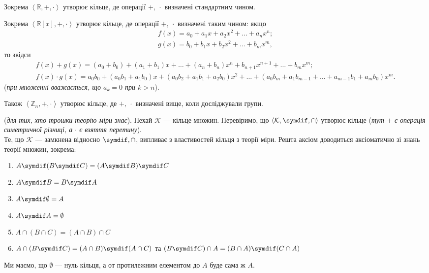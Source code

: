 \documentclass{math_library}
\begin{document}
\begin{example}
Зокрема $\left<\mathbb{R},+,\cdot\right>$ утворює кільце, де операції $+,\ \cdot$ визначені стандартним чином. 
\end{example}

\begin{example}
Зокрема $\left<\mathbb{R}[x],+,\cdot\right>$ утворює кільце, де операції $+,\ \cdot$ визначені таким чином: якщо
\begin{align*}
f(x) = a_0 + a_1x + a_2x^2 + \dots + a_nx^n; \\
g(x) = b_0 + b_1x + b_2x^2 + \dots + b_mx^m,
\end{align*}
то звідси
\begin{align*}
f(x) + g(x) = (a_0+b_0) + (a_1+b_1)x + \dots + (a_n+b_n)x^n + b_{n+1}x^{n+1} + \dots + b_mx^m; \\
f(x) \cdot g(x) = a_0b_0 + (a_0b_1+a_1b_0)x + (a_0b_2 + a_1b_1 + a_2b_0)x^2 + \dots +(a_0b_m+a_1b_{m-1}+\dots+ a_{m-1}b_1 + a_m b_0)x^m.
\end{align*}
(\textit{при множенні вважається, що $a_k = 0$ при $k > n$}).
\end{example}

\begin{example}
Також $\left<\mathbb{Z}_n,+,\cdot\right>$ утворює кільце, де $+,\ \cdot$ визначені вище, коли досліджували групи.
\end{example}

\begin{example}
(\textit{для тих, хто трошки теорію міри знає}). Нехай $\mathcal{K}$ --- кільце множин. Перевіримо, що $\left<\mathcal{K},\symdif,\cap\right>$ утворює кільце (\textit{тут $+$ є операція симетричної різниці, а $\cdot$ є взяття перетину}).
\bigskip \\
Те, що $\mathcal{K}$ --- замкнена відносно $\symdif, \cap$, випливає з властивостей кільця з теорії міри. Решта аксіом доводиться аксіоматично зі знань теорії множин, зокрема:
\begin{enumerate}[nosep,wide=0pt,label={\arabic*)}]
\item $A \symdif (B \symdif C) = (A \symdif B) \symdif C$
\item $A \symdif B = B \symdif A$
\item $A \symdif \emptyset = A$
\item $A \symdif A = \emptyset$
\item $A \cap (B \cap C) = (A \cap B) \cap C$
\item $A \cap (B \symdif C) = (A \cap B) \symdif (A \cap C)$ та $(B \symdif C) \cap A = (B \cap A) \symdif (C \cap A)$
\end{enumerate}
Ми маємо, що $\emptyset$ --- нуль кільця, а от протилежним елементом до $A$ буде сама ж $A$.
\end{example}
\end{document}
